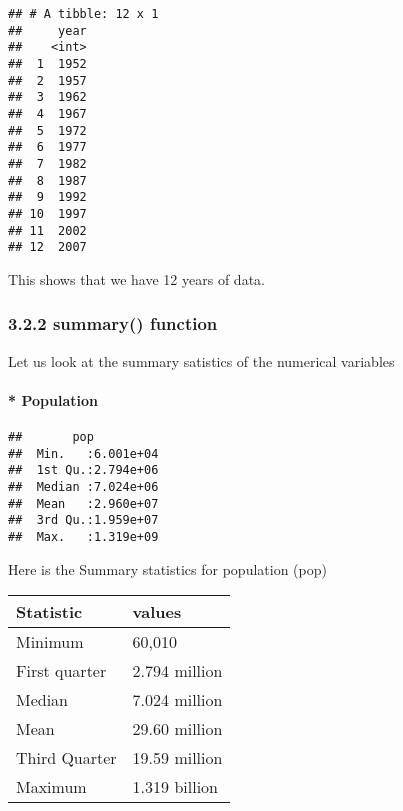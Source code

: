 \documentclass[]{article}
\newenvironment{Shaded}{\begin{snugshade}}{\end{snugshade}}
\newcommand{\KeywordTok}[1]{\textcolor[rgb]{0.13,0.29,0.53}{\textbf{{#1}}}}
\newcommand{\StringTok}[1]{\textcolor[rgb]{0.31,0.60,0.02}{{#1}}}
\newcommand{\CommentTok}[1]{\textcolor[rgb]{0.56,0.35,0.01}{\textit{{#1}}}}
\newcommand{\NormalTok}[1]{{#1}}
\let\oldparagraph\paragraph
\renewcommand{\paragraph}[1]{\oldparagraph{#1}\mbox{}}
\begin{document}
\begin{Shaded}
\end{Shaded}

\begin{verbatim}
## # A tibble: 12 x 1
##     year
##    <int>
##  1  1952
##  2  1957
##  3  1962
##  4  1967
##  5  1972
##  6  1977
##  7  1982
##  8  1987
##  9  1992
## 10  1997
## 11  2002
## 12  2007
\end{verbatim}

This shows that we have 12 years of data.

\subsubsection{\texorpdfstring{3.2.2 \textbf{summary()}
function}{3.2.2 summary() function}}\label{summary-function}

Let us look at the summary satistics of the numerical variables

\paragraph{\texorpdfstring{*
\textbf{Population}}{* Population}}\label{population}

\begin{Shaded}
\end{Shaded}

\begin{verbatim}
##       pop           
##  Min.   :6.001e+04  
##  1st Qu.:2.794e+06  
##  Median :7.024e+06  
##  Mean   :2.960e+07  
##  3rd Qu.:1.959e+07  
##  Max.   :1.319e+09
\end{verbatim}

Here is the Summary statistics for population (pop)

\begin{longtable}[]{@{}ll@{}}
\toprule
Statistic & values\tabularnewline
\midrule
\endhead
Minimum & 60,010\tabularnewline
First quarter & 2.794 million\tabularnewline
Median & 7.024 million\tabularnewline
Mean & 29.60 million\tabularnewline
Third Quarter & 19.59 million\tabularnewline
Maximum & 1.319 billion\tabularnewline
\bottomrule
\end{longtable}
\end{document}
